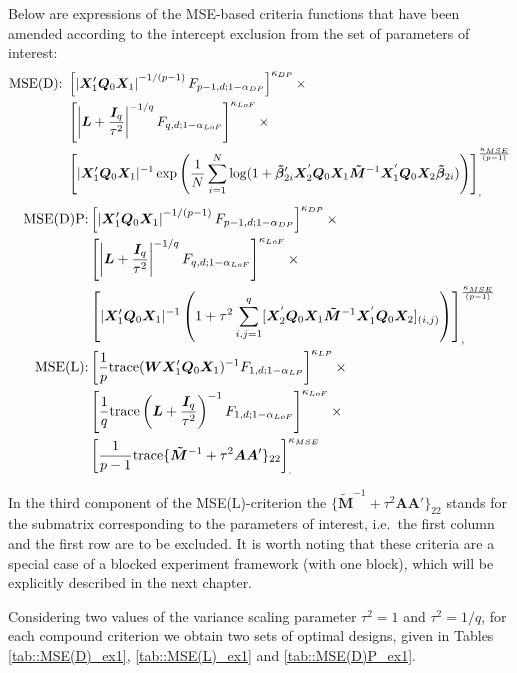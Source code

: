 Below are expressions of the MSE-based criteria functions that have been amended according to the intercept exclusion from the set of parameters of interest:
\begin{align*}
\mbox{MSE(D): }&\left[\left|\bm{X}'_{1}\bm{Q}_0\bm{X}_{1}\right|^{-1/(p-1)}F_{p-1,d;1-\alpha_{DP}}\right]^{\kappa_{DP}} \times \notag \\ &\left[\left|\bm{L}+\frac{\bm{I}_{q}}{\tau^{2}}\right|^{-1/q}F_{q,d;1-\alpha_{LoF}}\right]^{\kappa_{LoF}}\times \notag\\ & \left[|\bm{X}'_{1}\bm{Q}_0\bm{X}_{1}|^{-1}\exp\left(\frac{1}{N}\sum_{i=1}^{N}\log(1+\bm{\tilde{\beta}}_{2i}'\bm{X}_2^{'}\bm{Q}_{0}\bm{X}_1\bm{\tilde{M}}^{-1}\bm{X}_1^{'}\bm{Q}_{0}\bm{X}_2\bm{\tilde{\beta}}_{2i})\right)\right]_{,}^\frac{\kappa_{MSE}}{(p-1)}
\end{align*}
\begin{align*}
\mbox{MSE(D)P:}&\left[\left|\bm{X}'_{1}\bm{Q}_0\bm{X}_{1}\right|^{-1/(p-1)}F_{p-1,d;1-\alpha_{DP}}\right]^{\kappa_{DP}} \times \notag \\ &\left[\left|\bm{L}+\frac{\bm{I}_{q}}{\tau^{2}}\right|^{-1/q}F_{q,d;1-\alpha_{LoF}}\right]^{\kappa_{LoF}}\times \notag\\ & \left[|\bm{X}'_{1}\bm{Q}_0\bm{X}_{1}|^{-1}\left(1+\tau^2\sum_{i,j=1}^{q}[\bm{X}_2^{'}\bm{Q}_{0}\bm{X}_1\bm{\tilde{M}}^{-1}\bm{X}_1^{'}\bm{Q}_{0}\bm{X}_2]_{(i,j)}\right)\right]_{,}^\frac{\kappa_{MSE}}{(p-1)}\\
\mbox{MSE(L):} &\left[\frac{1}{p}\mbox{trace}(\bm{WX}'_{1}\bm{Q}_{0}\bm{X}_{1})^{-1}F_{1,d;1-\alpha_{LP}}\right]^{\kappa_{LP}}\times \notag\\& \left[\frac{1}{q}\mbox{trace}\left(\bm{L}+\frac{\bm{I}_{q}}{\tau^{2}}\right)^{-1}F_{1,d;1-\alpha_{LoF}}\right]^{\kappa_{LoF}}\times 
\notag\\& \left[\frac{1}{p-1}\mbox{trace}\{\bm{\tilde{M}}^{-1}+\tau^2\bm{A}\bm{A}'\}_{22}\right]_{.}^{\kappa_{MSE}}
\end{align*}

In the third component of the MSE(L)-criterion the $\{\bm{\tilde{M}}^{-1}+\tau^2\bm{A}\bm{A}'\}_{22}$ stands for the submatrix corresponding to the parameters of interest, i.e.~the first column and the first row are to be excluded. It is worth noting that these criteria are a special case of a blocked experiment framework (with one block), which will be explicitly described in the next chapter.

Considering two values of the variance scaling parameter $\tau^2=1$ and $\tau^2=1/q$, for each compound criterion we obtain two sets of optimal designs, given in Tables \ref{tab::MSE(D)_ex1}, \ref{tab::MSE(L)_ex1} and \ref{tab::MSE(D)P_ex1}. 

